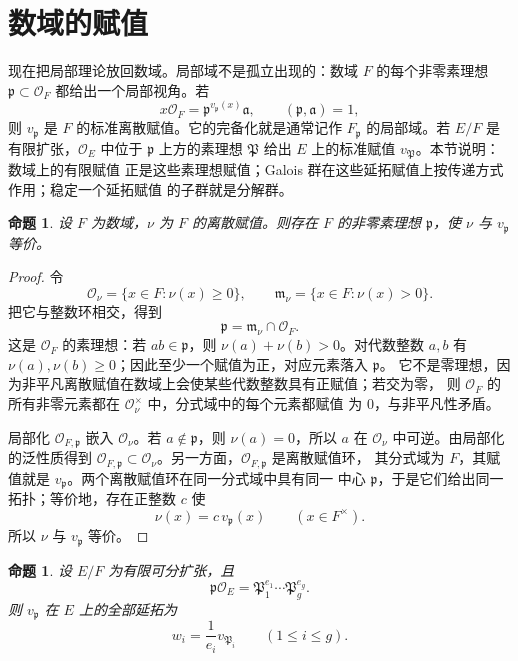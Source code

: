 \documentclass[11pt,a4paper,openany]{ctexbook}
\numberwithin{equation}{chapter}
\newcommand{\OF}{\mathcal{O}_F}
\theoremstyle{plain}
\newtheorem{proposition}[theorem]{命题}
\theoremstyle{definition}
\theoremstyle{remark}
\begin{document}
\section{数域的赋值}

现在把局部理论放回数域。局部域不是孤立出现的：数域 $F$ 的每个非零素理想
$\mathfrak p\subset\OF$ 都给出一个局部视角。若
\[
x\OF=\mathfrak p^{v_{\mathfrak p}(x)}\mathfrak a,\qquad
(\mathfrak p,\mathfrak a)=1,
\]
则 $v_{\mathfrak p}$ 是 $F$ 的标准离散赋值。它的完备化就是通常记作 $F_{\mathfrak p}$
的局部域。若 $E/F$ 是有限扩张，$\mathcal O_E$ 中位于 $\mathfrak p$ 上方的素理想
$\mathfrak P$ 给出 $E$ 上的标准赋值 $v_{\mathfrak P}$。本节说明：数域上的有限赋值
正是这些素理想赋值；Galois 群在这些延拓赋值上按传递方式作用；稳定一个延拓赋值
的子群就是分解群。

\begin{proposition}
设 $F$ 为数域，$\nu$ 为 $F$ 的离散赋值。则存在 $F$ 的非零素理想 $\mathfrak p$，使
$\nu$ 与 $v_{\mathfrak p}$ 等价。
\end{proposition}

\begin{proof}
令
\[
\mathcal O_\nu=\{x\in F:\nu(x)\ge0\},\qquad
\mathfrak m_\nu=\{x\in F:\nu(x)>0\}.
\]
把它与整数环相交，得到
\[
\mathfrak p=\mathfrak m_\nu\cap\OF.
\]
这是 $\OF$ 的素理想：若 $ab\in\mathfrak p$，则 $\nu(a)+\nu(b)>0$。对代数整数
$a,b$ 有 $\nu(a),\nu(b)\ge0$；因此至少一个赋值为正，对应元素落入 $\mathfrak p$。
它不是零理想，因为非平凡离散赋值在数域上会使某些代数整数具有正赋值；若交为零，
则 $\OF$ 的所有非零元素都在 $\mathcal O_\nu^\times$ 中，分式域中的每个元素都赋值
为 $0$，与非平凡性矛盾。

局部化 $\mathcal O_{F,\mathfrak p}$ 嵌入 $\mathcal O_\nu$。若 $a\notin\mathfrak p$，则
$\nu(a)=0$，所以 $a$ 在 $\mathcal O_\nu$ 中可逆。由局部化的泛性质得到
$\mathcal O_{F,\mathfrak p}\subset\mathcal O_\nu$。另一方面，$\mathcal O_{F,\mathfrak p}$ 是离散赋值环，
其分式域为 $F$，其赋值就是 $v_{\mathfrak p}$。两个离散赋值环在同一分式域中具有同一
中心 $\mathfrak p$，于是它们给出同一拓扑；等价地，存在正整数 $c$ 使
\[
\nu(x)=c\,v_{\mathfrak p}(x)\qquad(x\in F^\times).
\]
所以 $\nu$ 与 $v_{\mathfrak p}$ 等价。
\end{proof}

\begin{proposition}
设 $E/F$ 为有限可分扩张，且
\[
\mathfrak p\mathcal O_E=\mathfrak P_1^{e_1}\cdots\mathfrak P_g^{e_g}.
\]
则 $v_{\mathfrak p}$ 在 $E$ 上的全部延拓为
\[
w_i=\frac1{e_i}v_{\mathfrak P_i}\qquad(1\le i\le g).
\]
\end{proposition}
\end{document}
